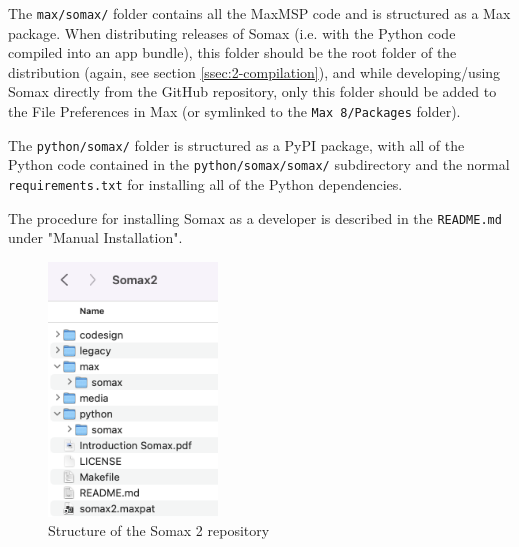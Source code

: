 The \texttt{max/somax/} folder contains all the MaxMSP code and is structured as a Max package. When distributing releases of Somax (i.e. with the Python code compiled into an app bundle), this folder should be the root folder of the distribution (again, see section \ref{ssec:2-compilation}), and while developing/using Somax directly from the GitHub repository,  only this folder should be added to the File Preferences in Max (or symlinked to the \texttt{Max\ 8/Packages} folder).

The \texttt{python/somax/} folder is structured as a PyPI package, with all of the Python code contained in the \texttt{python/somax/somax/} subdirectory and the normal \texttt{requirements.txt} for installing all of the Python dependencies. 

The procedure for installing Somax as a developer is described in the \texttt{README.md} under "Manual Installation".


 \begin{figure}[h!]
    \centering        
 	\includegraphics[width=0.4\textwidth, keepaspectratio]{figures/files-folders.png}
    \caption{Structure of the Somax 2 repository}
    \label{fig:1-filesfolders}
\end{figure}